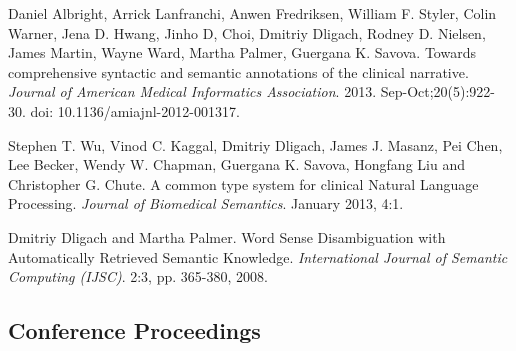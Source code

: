 \documentclass[letterpaper]{article}
\renewenvironment{itemize}{
  \begin{list}{}{
    \setlength{\leftmargin}{1.5em}
  }
}{
  \end{list}
}
\begin{document}
\begin{itemize}
\item Daniel Albright, Arrick Lanfranchi, Anwen Fredriksen, William F. Styler, Colin Warner, Jena D. Hwang, Jinho D, Choi, Dmitriy Dligach, Rodney D. Nielsen, James Martin, Wayne Ward, Martha Palmer, Guergana K. Savova. Towards comprehensive syntactic and semantic annotations of the clinical narrative. \emph{Journal of American Medical Informatics Association}. 2013. Sep-Oct;20(5):922-30. doi: 10.1136/amiajnl-2012-001317.
\item Stephen T. Wu, Vinod C. Kaggal, Dmitriy Dligach, James J. Masanz, Pei Chen, Lee Becker, Wendy W. Chapman, Guergana K. Savova, Hongfang Liu and Christopher G. Chute. A common type system for clinical Natural Language Processing. \emph{Journal of Biomedical Semantics}. January 2013, 4:1.
\item Dmitriy Dligach and Martha Palmer. Word Sense Disambiguation with Automatically Retrieved Semantic Knowledge. \emph {International Journal of Semantic Computing (IJSC)}. 2:3, pp. 365-380, 2008.
\end{itemize}

\subsection*{Conference Proceedings}
\end{document}

